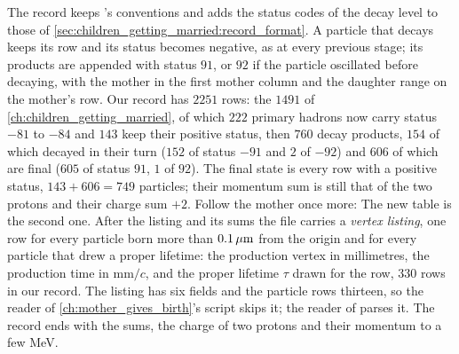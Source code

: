 The record keeps \PYTHIA's conventions and adds the status codes of the
decay level to those of \cref{sec:children_getting_married:record_format}.
A particle that decays keeps its row and its status becomes negative, as
at every previous stage; its products are appended with status $91$, or
$92$ if the particle oscillated before decaying, with the mother in the
first mother column and the daughter range on the mother's row. Our record
has $2251$ rows: the $1491$ of \cref{ch:children_getting_married}, of which
$222$ primary hadrons now carry status $-81$ to $-84$ and $143$ keep their
positive status, then $760$ decay products, $154$ of which decayed in their
turn ($152$ of status $-91$ and $2$ of $-92$) and $606$ of which are final
($605$ of status $91$, $1$ of $92$). The final state is every row with a
positive status, $143+606=749$ particles; their momentum sum is still that
of the two protons and their charge sum $+2$. Follow the mother once more:
The new table is the second one. After the listing and its sums the file
carries a \emph{vertex listing}, one row for every particle born more than
$0.1\,\mu\mathrm{m}$ from the origin and for every particle that drew a proper
lifetime: the production vertex in millimetres, the production time in
$\mathrm{mm}/c$, and the proper lifetime $\tau$ drawn for the row, $330$
rows in our record.
The listing has six fields and the particle rows thirteen, so the reader
of \cref{ch:mother_gives_birth}'s script skips it; the reader of
 parses it. The record ends with the sums,
the charge of two protons and their momentum to a few MeV.


